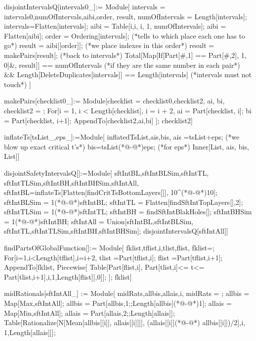 \begin{code}
disjointIntervalsQ[intervals0_]:= Module[
{intervals = intervals0,numOfIntervals,aibi,order, result},
	numOfIntervals = Length[intervals];
	intervals=Flatten[intervals];
	aibi = Table[{i,i}, {i, 1, numOfIntervals}];
	aibi = Flatten[aibi];
	order = Ordering[intervals]; (*tells to which place each one 
	has to go*)
	result = aibi[[order]]; (*we place indexes in this order*)
	result = makePairs[result]; (*back to intervals*)
	Total[Map[If[Part[#,1] == Part[#,2], 1, 0]&, result]]
	 == numOfIntervals (*if they are the same number in each pair*) 
	&& Length[DeleteDuplicates[intervals]] 
	== Length[intervals] (*intervals must not touch*)
]
\end{code}

\begin{code}
makePairs[checklist0_]:=
Module[{checklist = checklist0,checklist2, ai, bi},
	checklist2 = {};
	For[i = 1, i < Length[checklist], i = i + 2,
	ai = Part[checklist, i];
	bi = Part[checklist, i+1];
	AppendTo[checklist2,{ai,bi}]
];
checklist2]
\end{code}

\begin{code}
inflateTs[tsList_,eps_]:=Module[
	{inflatedTsList,ais,bis},
	ais =tsList+eps; (*we blow up exact critical t's*)
	bis=tsList(*@-@*)eps; (*for eps*)
	Inner[List, ais, bis, List]]
\end{code}

\begin{code}
disjointSafetyIntervalsQ[]:=Module[
{sftIntBL,sftIntBLSim,sftIntTL,
sftIntTLSim,sftIntBH,sftIntBHSim,sftIntAll},
	sftIntBL=inflateTs[Flatten[findCritTsBottomLayers[]], 10^(*@-@*)10];
	sftIntBLSim = 1(*@-@*)sftIntBL;
	sftIntTL = Flatten[findSftIntTopLayers[],2];
	sftIntTLSim = 1(*@-@*)sftIntTL;
	sftIntBH = findSftIntBlakHoles[];
	sftIntBHSim = 1(*@-@*)sftIntBH;
	sftIntAll = Union[sftIntBL,sftIntBLSim,
	sftIntTL,sftIntTLSim,sftIntBH,sftIntBHSim];
	disjointIntervalsQ[sftIntAll]]
\end{code}

\begin{code}
findPartsOfGlobalFunction[]:=
Module[
	{fklist,tflist,i,tlist,flist},
	fklist={};
	For[i=1,i<Length[tflist],i=i+2,
	tlist =Part[tflist,i];
	flist =Part[tflist,i+1];
	AppendTo[fklist, Piecewise[
	Table[{Part[flist,i],
	Part[tlist,i]<= t<= Part[tlist,i+1]},{i,1,Length[flist]}],0]];
];
fklist]
\end{code}

\begin{code}
midRationals[sftIntAll_] := Module[
{midRats,allbis,allais,i},
	midRats = {};
	allbis = Map[Max,sftIntAll];
	allbis = Part[allbis,1;;Length[allbis](*@-@*)1];
	allais = Map[Min,sftIntAll];
	allais = Part[allais,2;;Length[allais]];
	Table[Rationalize[N[Mean[{allbis[[i]], allais[[i]]}]], 
	(allais[[i]](*@-@*) allbis[[i]])/2],{i, 1,Length[allais]}]];
\end{code}

